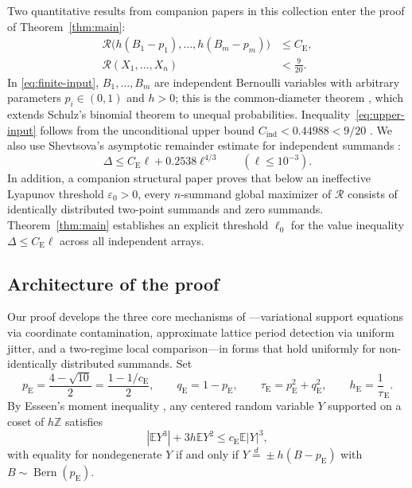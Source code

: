 \documentclass[11pt]{article}
\numberwithin{equation}{section}
\theoremstyle{remark}
\DeclareMathOperator{\Bern}{Bern}
\newcommand{\E}{\mathbb E}
\newcommand{\Z}{\mathbb Z}
\newcommand{\be}{C_{\mathrm E}}
\newcommand{\Cind}{C_{\mathrm{ind}}}
\newcommand{\ce}{c_{\mathrm E}}
\newcommand{\pe}{p_{\mathrm E}}
\newcommand{\qe}{q_{\mathrm E}}
\newcommand{\te}{\tau_{\mathrm E}}
\newcommand{\he}{h_{\mathrm E}}
\begin{document}
Two quantitative results from companion papers in this collection enter the
proof of Theorem~\ref{thm:main}:
\begin{align}
 \mathcal R\bigl(h(B_1-p_1),\ldots,h(B_m-p_m)\bigr)&\le\be,
                                                        \label{eq:finite-input}\\
 \mathcal R(X_1,\ldots,X_n)&<\frac9{20}.                \label{eq:upper-input}
\end{align}
In \eqref{eq:finite-input}, $B_1,\ldots,B_m$ are independent Bernoulli
variables with arbitrary parameters $p_i\in(0,1)$ and $h>0$; this is the
common-diameter theorem \citep[Theorem~1.2(ii)]{BellFinite2026}, which
extends Schulz's binomial theorem \citep[Theorem~1]{Schulz2016} to unequal
probabilities. Inequality~\eqref{eq:upper-input} follows from the
unconditional upper bound $\Cind<0.44988<9/20$ \citep[Theorem~1.1]{BellUpper2026}.
We also use Shevtsova's asymptotic remainder estimate for independent
summands \citep[Corollary~4.18, p.~303]{Shevtsova2012}:
\begin{equation}\label{eq:published-excess}
 \Delta\le\be\ell+0.2538\ell^{4/3}\qquad(\ell\le10^{-3}).
\end{equation}
In addition, a companion structural paper \citep{BellSmallStructure2026}
proves that below an ineffective Lyapunov threshold $\varepsilon_0>0$, every
$n$-summand global maximizer of $\mathcal R$ consists of identically
distributed two-point summands and zero summands. Theorem~\ref{thm:main}
establishes an explicit threshold $\ell_0$ for the value inequality
$\Delta\le\be\ell$ across all independent arrays.

\subsection{Architecture of the proof}

Our proof develops the three core mechanisms of \citet[Sections~2--5 and Appendix~A]{HeCheng2026}---variational
support equations via coordinate contamination, approximate lattice period
detection via uniform jitter, and a two-regime local comparison---in forms that
hold uniformly for non-identically distributed summands. Set
\begin{equation}\label{eq:esseen-data}
 \pe=\frac{4-\sqrt{10}}2=\frac{1-1/\ce}{2},\qquad
 \qe=1-\pe,\qquad\te=\pe^2+\qe^2,\qquad\he=\frac1\te.
\end{equation}
By Esseen's moment inequality \citep[pp.~160--163]{Esseen1956}, any centered
random variable $Y$ supported on a coset of $h\Z$ satisfies
\begin{equation}\label{eq:esseen-moment}
 |\E Y^3|+3h\E Y^2\le\ce\E|Y|^3,
\end{equation}
with equality for nondegenerate $Y$ if and only if $Y\stackrel d=\pm h(B-\pe)$
with $B\sim\Bern(\pe)$.
\end{document}
